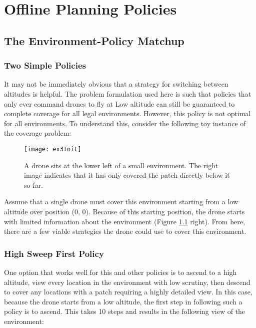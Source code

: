 \chapter{Offline Planning Policies}

\section{The Environment-Policy Matchup}

\subsection{Two Simple Policies}

It may not be immediately obvious that a strategy for switching between altitudes is helpful. The problem formulation used here is such that policies that only ever command drones to fly at Low altitude can still be guaranteed to complete coverage for all legal environments. However, this policy is not optimal for all environments. To understand this, consider the following toy instance of the coverage problem:

\begin{figure}[H]
\texttt{[image: ex3Init]}
\caption[Tiny Square Environment]{A drone sits at the lower left of a small environment. The right image indicates that it has only covered the patch directly below it so far.}
\label{fig:ex3-1-start}
\end{figure}

Assume that a single drone must cover this environment starting from a low altitude over position (0, 0). Because of this starting position, the drone starts with limited information about the environment (Figure \ref{fig:ex3-1-start} right). From here, there are a few viable strategies the drone could use to cover this environment.

\subsection{High Sweep First Policy}

One option that works well for this and other policies is to ascend to a high altitude, view every location in the environment with low scrutiny, then descend to cover any locations with a patch requiring a highly detailed view. In this case, because the drone starts from a low altitude, the first step in following such a policy is to ascend. This takes 10 steps and results in the following view of the environment:

